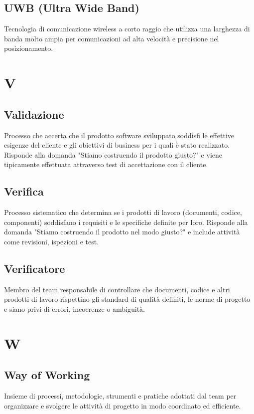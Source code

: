 \documentclass[a4paper,11pt]{article}
\begin{document}
\subsection{UWB (Ultra Wide Band)}
Tecnologia di comunicazione wireless a corto raggio che utilizza una larghezza di banda molto ampia per comunicazioni ad alta velocità e precisione nel posizionamento.

\newpage
\section{V}

\subsection{Validazione}
Processo che accerta che il prodotto software sviluppato soddisfi le effettive esigenze del cliente e gli obiettivi di business per i quali è stato realizzato. Risponde alla domanda "Stiamo costruendo il prodotto giusto?" e viene tipicamente effettuata attraverso test di accettazione con il cliente.

\subsection{Verifica}
Processo sistematico che determina se i prodotti di lavoro (documenti, codice, componenti) soddisfano i requisiti e le specifiche definite per loro. Risponde alla domanda "Stiamo costruendo il prodotto nel modo giusto?" e include attività come revisioni, ispezioni e test.

\subsection{Verificatore}
Membro del team responsabile di controllare che documenti, codice e altri prodotti di lavoro rispettino gli standard di qualità definiti, le norme di progetto e siano privi di errori, incoerenze o ambiguità.

\newpage
\section{W}

\subsection{Way of Working}
Insieme di processi, metodologie, strumenti e pratiche adottati dal team per organizzare e svolgere le attività di progetto in modo coordinato ed efficiente.
\end{document}
